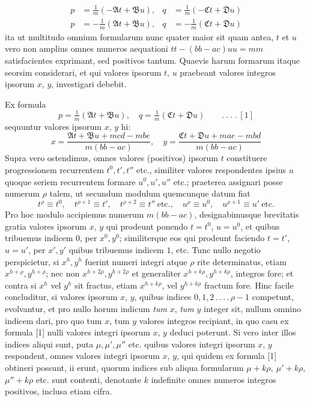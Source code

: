 \[
\begin{aligned}
p&=\tfrac{1}{m}(-\mathfrak{A}t+\mathfrak{B}u),&
q&=\tfrac{1}{m}(-\mathfrak{C}t+\mathfrak{D}u)\\
p&=-\tfrac{1}{m}(\mathfrak{A}t+\mathfrak{B}u),&
q&=-\tfrac{1}{m}(\mathfrak{C}t+\mathfrak{D}u)
\end{aligned}
\]
ita ut multitudo omnium formularum nunc quater maior sit quam antea, $t$ et $u$
vero non amplius omnes numeros aequationi $tt-(bb-ac)uu=mm$ satisfacientes exprimant,
sed positivos tantum. Quaevis harum formarum itaque seorsim considerari,
et qui valores ipsorum $t$, $u$ praebeant valores integros ipsorum $x$, $y$,
investigari debebit.

Ex formula
\[
p=\tfrac{1}{m}(\mathfrak{A}t+\mathfrak{B}u),\quad
q=\tfrac{1}{m}(\mathfrak{C}t+\mathfrak{D}u)\qquad .\ .\ .\ .\ [1]
\]
sequuntur valores ipsorum $x$, $y$ hi:
\[
x=\frac{\mathfrak{A}t+\mathfrak{B}u+mcd-mbe}{m(bb-ac)},\quad
y=\frac{\mathfrak{C}t+\mathfrak{D}u+mae-mbd}{m(bb-ac)}
\]
Supra vero ostendimus, omnes valores (positivos) ipsorum $t$ constituere progressionem
recurrentem $t^0,t',t''$ etc., similiter valores respondentes ipsius $u$ quoque
seriem recurrentem formare $u^0,u',u''$ etc.; praeterea assignari posse numerum $\rho$
talem, ut secundum modulum quemcunque datum fiat
\[
t^\rho\equiv t^0,\quad t^{\rho+1}\equiv t',\quad t^{\rho+2}\equiv t''\ \text{etc.},\quad
u^\rho\equiv u^0,\quad u^{\rho+1}\equiv u'\ \text{etc.}
\]
Pro hoc modulo accipiemus numerum $m(bb-ac)$, designabimusque brevitatis gratia
valores ipsorum $x$, $y$ qui prodeunt ponendo $t=t^0$, $u=u^0$, et quibus
tribuemus indicem $0$, per $x^0,y^0$; similiterque eos qui prodeunt faciendo
$t=t'$, $u=u'$, per $x',y'$ quibus tribuemus indicem $1$, etc.
Tunc nullo negotio perspicietur, si $x^h,y^h$ fuerint numeri integri atque $\rho$
rite determinatus, etiam $x^{h+\rho},y^{h+\rho}$; nec non
$x^{h+2\rho},y^{h+2\rho}$ et generaliter $x^{h+k\rho},y^{h+k\rho}$,
integros fore; et contra si $x^h$ vel $y^h$ sit fractus, etiam $x^{h+k\rho}$,
vel $y^{h+k\rho}$ fractum fore. Hinc facile concluditur, si valores ipsorum
$x$, $y$, quibus indices $0,1,2\,.\,.\,.\,.\,\rho-1$ competunt, evolvantur,
et pro nullo horum indicum \textit{tum} $x$, \textit{tum} $y$ integer sit,
nullum omnino indicem dari, pro quo tum $x$, tum $y$ valores integros recipiant,
in quo casu ex formula [1] nulli valores integri ipsorum $x$, $y$ deduci poterunt.
Si vero inter illos indices aliqui sunt, puta $\mu,\mu',\mu''$ etc. quibus valores
integri ipsorum $x$, $y$ respondent, omnes valores integri ipsorum $x$, $y$,
qui quidem ex formula [1] obtineri possunt, ii erunt, quorum indices sub aliqua
formularum $\mu+k\rho,\ \mu'+k\rho,$
$\mu''+k\rho$ etc. sunt contenti, denotante $k$ indefinite omnes numeros integros
positivos, inclusa etiam cifra.

